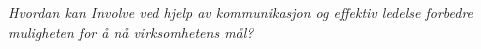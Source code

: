 \textit{ Hvordan kan Involve ved hjelp av kommunikasjon og effektiv ledelse forbedre muligheten for å nå virksomhetens mål?} 
